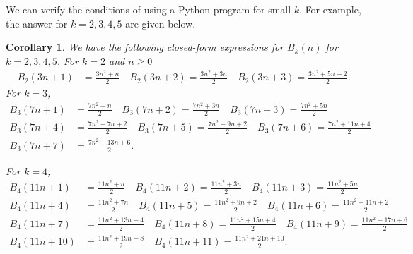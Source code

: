 \documentclass[11pt,reqno]{amsart}
\theoremstyle{plain}
\newtheorem{corollary}[theorem]{Corollary}
\theoremstyle{definition}
\theoremstyle{remark}
\numberwithin{equation}{section}
\numberwithin{equation}{section}
\begin{document}
We can verify the conditions of  using a Python program for small $k$. For example, the answer for $k=2,3,4,5$ are given below.

\begin{corollary}
\label{cor:manyquadrics}
We have the following closed-form expressions for $B_k(n)$ for $k=2,3,4,5$. For $k=2$ and $n\geq 0$
\begin{align*}
    B_2(3n+1)&=\frac{3n^2+n}{2} \quad
    B_2(3n+2)=\frac{3n^2+3n}{2} \quad
    B_2(3n+3)=\frac{3n^2+5n+2}{2}.
\end{align*}
For $k=3$,
\begin{align*}
    B_3(7n+1)&=\frac{7n^2+n}{2}\quad
    B_3(7n+2)=\frac{7n^2+3n}{2}\quad
    B_3(7n+3)=\frac{7n^2+5n}{2}\\
    B_3(7n+4)&=\frac{7n^2+7n+2}{2}\quad
    B_3(7n+5)=\frac{7n^2+9n+2}{2}\quad
    B_3(7n+6)=\frac{7n^2+11n+4}{2}\\
    B_3(7n+7)&=\frac{7n^2+13n+6}{2}.
\end{align*}

For $k=4$,
\begin{align*}
    B_4(11n+1)&=\frac{11n^2+n}{2}\quad
    B_4(11n+2)=\frac{11n^2+3n}{2}\quad
    B_4(11n+3)=\frac{11n^2+5n}{2}\\
    B_4(11n+4)&=\frac{11n^2+7n}{2}\quad
    B_4(11n+5)=\frac{11n^2+9n+2}{2}\quad
    B_4(11n+6)=\frac{11n^2+11n+2}{2}\\
    B_4(11n+7)&=\frac{11n^2+13n+4}{2}\quad
    B_4(11n+8)=\frac{11n^2+15n+4}{2}\quad
    B_4(11n+9)=\frac{11n^2+17n+6}{2}\\
    B_4(11n+10)&=\frac{11n^2+19n+8}{2}\quad
    B_4(11n+11)=\frac{11n^2+21n+10}{2}.\quad
\end{align*}

\end{corollary}
\end{document}
